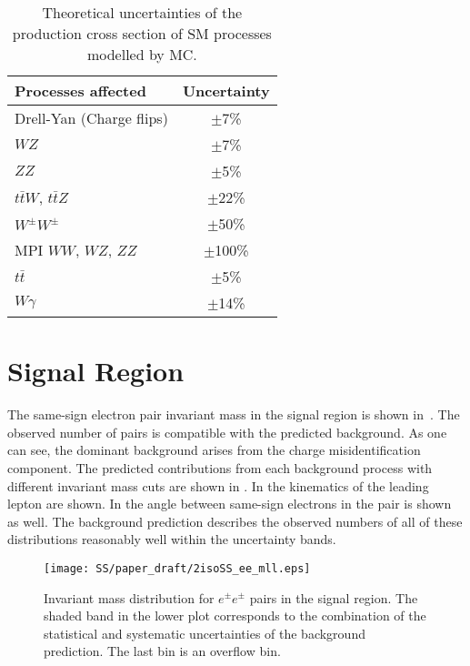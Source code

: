 \begin{table}[ht]
\begin{center}
\begin{tabular}{l|c}
Processes affected & Uncertainty \\
\hline
 Drell-Yan (Charge flips) & $\pm$7\% \\
 $WZ$ & $\pm$7\% \\
 $ZZ$ & $\pm$5\% \\
 $t\bar{t}W$, $t\bar{t}Z$  & $\pm$22\% \\
 $W^{\pm}W^{\pm}$ & $\pm$50\% \\
 MPI $WW$, $WZ$, $ZZ$ & $\pm$100\% \\
 $t\bar{t}$ & $\pm$5\% \\
 $W\gamma$ & $\pm$14\% \\
\end{tabular}
\end{center}
\caption{Theoretical uncertainties of the production cross section of SM processes modelled by MC.}
\label{tab:systematics_common}
\end{table}



\section{Signal Region}
\label{sec:ss_signalRegion}

The same-sign electron pair invariant mass in the signal region is shown in~.
The observed number of pairs is compatible with the predicted background.
As one can see, the dominant background arises from the charge misidentification component.
The predicted contributions from each background process with different invariant mass cuts are shown in .
In  the kinematics of the leading lepton are shown. 
In  the angle between same-sign electrons in the pair is shown as well.
The background prediction describes the observed numbers of all of these distributions reasonably well within the uncertainty bands.

\begin{figure}[h]
\begin{center}
\texttt{[image: SS/paper\_draft/2isoSS\_ee\_mll.eps]}
\caption{Invariant mass distribution for $e^{\pm}e^{\pm}$ pairs in the signal region. 
The shaded band in the lower plot corresponds to the combination of the statistical and systematic uncertainties of the background prediction.
The last bin is an overflow bin.}
\label{fig:signal_mass}
\end{center}
\end{figure}

